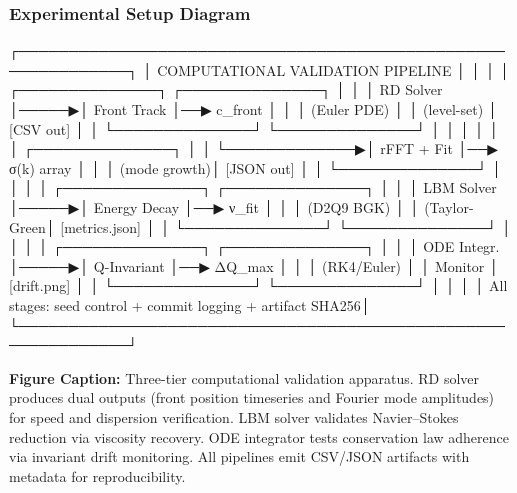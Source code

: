 \documentclass[
]{article}
\newenvironment{Shaded}{}{}
\newcommand{\NormalTok}[1]{#1}
\begin{document}
\hypertarget{experimental-setup-diagram}{%
\subsubsection{Experimental Setup
Diagram}\label{experimental-setup-diagram}}

\begin{Shaded}
\begin{Highlighting}[]
\NormalTok{┌─────────────────────────────────────────────────────────────┐}
\NormalTok{│  COMPUTATIONAL VALIDATION PIPELINE                           │}
\NormalTok{│                                                              │}
\NormalTok{│  ┌──────────────┐      ┌──────────────┐                    │}
\NormalTok{│  │ RD Solver    │─────▶│ Front Track  │──▶ c\_front         │}
\NormalTok{│  │ (Euler PDE)  │      │ (level{-}set)  │    [CSV out]       │}
\NormalTok{│  └──────────────┘      └──────────────┘                    │}
\NormalTok{│         │                                                    │}
\NormalTok{│         │              ┌──────────────┐                    │}
\NormalTok{│         └─────────────▶│ rFFT + Fit   │──▶ σ(k) array      │}
\NormalTok{│                        │ (mode growth)│    [JSON out]      │}
\NormalTok{│                        └──────────────┘                    │}
\NormalTok{│                                                              │}
\NormalTok{│  ┌──────────────┐      ┌──────────────┐                    │}
\NormalTok{│  │ LBM Solver   │─────▶│ Energy Decay │──▶ ν\_fit           │}
\NormalTok{│  │ (D2Q9 BGK)   │      │ (Taylor{-}Green│    [metrics.json]  │}
\NormalTok{│  └──────────────┘      └──────────────┘                    │}
\NormalTok{│                                                              │}
\NormalTok{│  ┌──────────────┐      ┌──────────────┐                    │}
\NormalTok{│  │ ODE Integr.  │─────▶│ Q{-}Invariant  │──▶ ΔQ\_max          │}
\NormalTok{│  │ (RK4/Euler)  │      │ Monitor      │    [drift.png]     │}
\NormalTok{│  └──────────────┘      └──────────────┘                    │}
\NormalTok{│                                                              │}
\NormalTok{│  All stages: seed control + commit logging + artifact SHA256│}
\NormalTok{└─────────────────────────────────────────────────────────────┘}
\end{Highlighting}
\end{Shaded}

\textbf{Figure Caption:} Three-tier computational validation apparatus.
RD solver produces dual outputs (front position timeseries and Fourier
mode amplitudes) for speed and dispersion verification. LBM solver
validates Navier--Stokes reduction via viscosity recovery. ODE
integrator tests conservation law adherence via invariant drift
monitoring. All pipelines emit CSV/JSON artifacts with metadata for
reproducibility.
\end{document}
